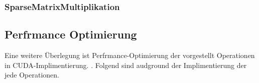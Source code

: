 

\subsubsection{SparseMatrixMultiplikation}


\subsection{Perfrmance Optimierung}
Eine weitere Überlegung ist Perfrmance-Optimierung der vorgestellt Operationen in CUDA-Implimentierung. .
Folgend sind audground der Implimentierung der jede Operationen.


